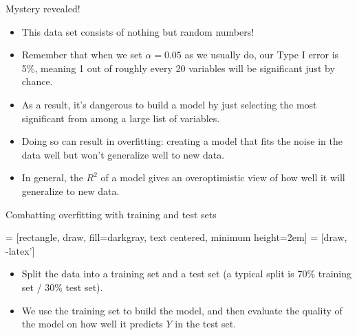 \documentclass{beamer}\usepackage[]{graphicx}\usepackage[]{color}
\begin{document}
\begin{darkframes}
    \begin{frame}{Mystery revealed!}
      \begin{itemize}[<+->]
        \item This data set consists of nothing but random numbers!
        \item Remember that when we set $\alpha=0.05$ as we usually do, our Type I error is 5\%, meaning 1 out of roughly every 20 variables will be significant just by chance.
        \item As a result, it's dangerous to build a model by just selecting the most significant from among a large list of variables.
        \item Doing so can result in \alert{overfitting}: creating a model that fits the noise in the data well but won't generalize well to new data.
        \item In general, the $R^2$ of a model gives an overoptimistic view of how well it will generalize to new data.
      \end{itemize}
    \end{frame}

    \begin{frame}{Combatting overfitting with training and test sets}
      \begin{center}
         = [rectangle, draw, fill=darkgray,
          text centered, minimum height=2em]
         = [draw, -latex']

      \end{center}

      \begin{itemize}
        \item Split the data into a \alert{training set} and a \alert{test set} (a typical split is 70\% training set / 30\% test set).
        \item We use the training set to build the model, and then evaluate the quality of the model on how well it predicts $Y$ in the test set.
      \end{itemize}
    \end{frame}


\end{darkframes}
\end{document}
